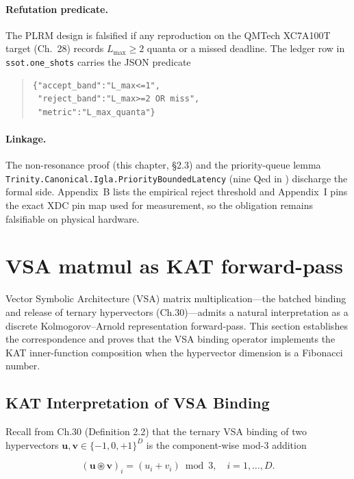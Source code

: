 \paragraph{Refutation predicate.}
The PLRM design is falsified if any reproduction on the QMTech XC7A100T
target (Ch.~28) records $L_{\max} \ge 2$ quanta or a missed deadline.
The ledger row in \texttt{ssot.one\_shots} carries the JSON predicate
\begin{quote}\footnotesize
\begin{verbatim}
{"accept_band":"L_max<=1",
 "reject_band":"L_max>=2 OR miss",
 "metric":"L_max_quanta"}
\end{verbatim}
\end{quote}

\paragraph{Linkage.}
The non-resonance proof (this chapter, §2.3) and the priority-queue lemma
\texttt{Trinity.Canonical.Igla.PriorityBoundedLatency} (nine Qed in
) discharge the formal side.
Appendix~B lists the empirical reject threshold and Appendix~I pins the
exact XDC pin map used for measurement, so the obligation remains
falsifiable on physical hardware.

\section{VSA matmul as KAT
forward-pass}\label{fa_24:vsa-matmul-as-kat-forward-pass}

Vector Symbolic Architecture (VSA) matrix
multiplication---the batched binding and release of
ternary hypervectors (Ch.30)---admits a natural
interpretation as a discrete Kolmogorov--Arnold
representation forward-pass. This section establishes
the correspondence and proves that the VSA binding
operator implements the KAT inner-function
composition when the hypervector dimension is a
Fibonacci number.

\subsection{KAT Interpretation of VSA
Binding}\label{fa_24:kat-interpretation-vsa}

Recall from Ch.30 (Definition 2.2) that the
ternary VSA binding of two hypervectors
\(\mathbf{u}, \mathbf{v} \in \{-1, 0, +1\}^D\) is
the component-wise mod-3 addition

\[
(\mathbf{u} \circledast \mathbf{v})_i = (u_i + v_i) \bmod 3, \quad i = 1, \ldots, D.
\]


